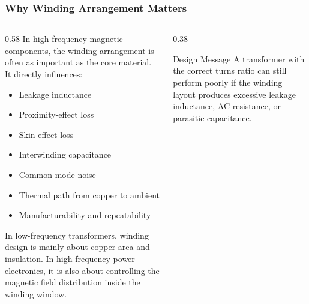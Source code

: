 \begin{frame}
    \frametitle{Why Winding Arrangement Matters}

    \begin{columns}
        \begin{column}{0.58\textwidth}
            In high-frequency magnetic components, the winding arrangement is often as important as the core material. It directly influences:
            \begin{itemize}
                \item Leakage inductance
                \item Proximity-effect loss
                \item Skin-effect loss
                \item Interwinding capacitance
                \item Common-mode noise
                \item Thermal path from copper to ambient
                \item Manufacturability and repeatability
            \end{itemize}
            In low-frequency transformers, winding design is mainly about copper area and insulation. In high-frequency power electronics, it is also about controlling the magnetic field distribution inside the winding window.
        \end{column}

        \begin{column}{0.38\textwidth}
            \begin{block}{Design Message}
                \small
                A transformer with the correct turns ratio can still perform poorly if the winding layout produces excessive leakage inductance, AC resistance, or parasitic capacitance.
            \end{block}
        \end{column}
    \end{columns}
\end{frame}


